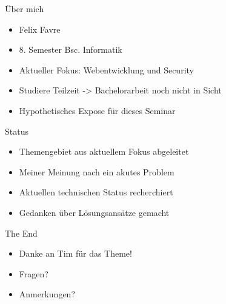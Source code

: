 \documentclass{beamer}
\institute{Universität Hamburg -- Fachbereich Informatik -- Abschlussarbeiten Seminar}
\date[15.04.2015]{22. April 2015}
\title{\myTitle}
\author{\myName}
\begin{document}
{
    \frame{
        \titlepage
    }
}

\begin{frame}{Über mich}
  \begin{itemize}
    \item Felix Favre
    \item 8. Semester Bsc. Informatik
    \item Aktueller Fokus: Webentwicklung und Security
    \pause
    \item Studiere Teilzeit -> Bachelorarbeit noch nicht in Sicht
    \item Hypothetisches Expose für dieses Seminar
  \end{itemize}
\end{frame}

\begin{frame}{Status}
  \begin{itemize}
    \item Themengebiet aus aktuellem Fokus abgeleitet
    \item Meiner Meinung nach ein akutes Problem
    \item Aktuellen technischen Status recherchiert
    \item Gedanken über Lösungsansätze gemacht
  \end{itemize}
\end{frame}

\begin{frame}{The End}
  \begin{itemize}
    \item Danke an Tim für das Theme!
    \item Fragen?
    \item Anmerkungen?
  \end{itemize}
\end{frame}
\end{document}
